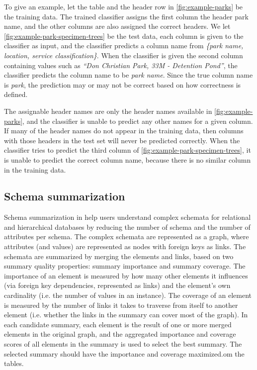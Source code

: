 To give an example, let the table and the header row in \autoref{fig:example-parks} be the training data. The trained classifier assigns the first column the header park name, and the other columns are also assigned the correct headers. We let \autoref{fig:example-park-specimen-trees} be the test data, each column is given to the classifier as input, and the classifier predicts a column name from \textit{\{park name, location, service classification\}}. When the classifier is given the second column containing values such as \textit{``Don Christian Park, 33M - Detention Pond''}, the classifier predicts the column name to be \textit{park name}. Since the true column name is \textit{park}, the prediction may or may not be correct based on how correctness is defined.

The assignable header names are only the header names available in \autoref{fig:example-parks}, and the classifier is unable to predict any other names for a given column. If many of the header names do not appear in the training data, then columns with those headers in the test set will never be predicted correctly. When the classifier tries to predict the third column of \autoref{fig:example-park-specimen-trees}, it is unable to predict the correct column name, because there is no similar column in the training data.

\subsection{Schema summarization}
\label{ssec:SchemaSummarization}

Schema summarization in \cite{Yu2006Schema} help users understand complex schemata for relational and hierarchical databases by reducing the number of schema and the number of attributes per schema. The complex schemata are represented as a graph, where attributes (and values) are represented as nodes with foreign keys as links. The schemata are summarized by merging the elements and links, based on two summary quality properties: summary importance and summary coverage. The importance of an element is measured by how many other elements it influences (via foreign key dependencies, represented as links) and the element's own cardinality (i.e. the number of values in an instance). The coverage of an element is measured by the number of links it takes to traverse from itself to another element (i.e. whether the links in the summary can cover most of the graph). In each candidate summary, each element is the result of one or more merged elements in the original graph, and the aggregated importance and coverage scores of all elements in the summary is used to select the best summary. The selected summary should have the importance and coverage maximized.om the tables.

